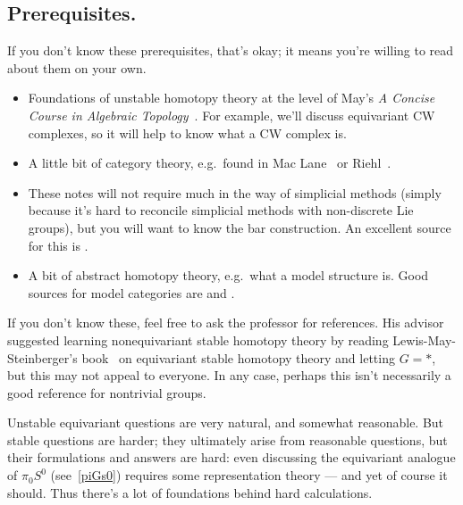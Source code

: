 \subsection*{Prerequisites.} If you don't know these prerequisites, that's okay; it means you're willing to read
about them on your own.
\begin{itemize}
	\item Foundations of unstable homotopy theory at the level of May's \textit{A Concise Course in Algebraic
	Topology}~\cite{ConciseCourse}. For example, we'll discuss equivariant CW complexes, so it will help to know
	what a CW complex is.
	\item A little bit of category theory, e.g.\ found in Mac Lane~\cite{MacLane} or Riehl~\cite{RiehlCTC}.
	\item These notes will not require much in the way of simplicial methods (simply because it's hard to reconcile
	simplicial methods with non-discrete Lie groups), but you will want to know the bar construction. An excellent source for this is \cite[Chapter 4]{RiehlCHT}.
	\item A bit of abstract homotopy theory, e.g.\ what a model structure is. Good sources for model categories are \cite[Part III]{RiehlCHT} and \cite{Hovey}.
\end{itemize}
If you don't know these, feel free to ask the professor for references. His advisor suggested learning
nonequivariant stable homotopy theory by reading Lewis-May-Steinberger's book~\cite{LMS} on equivariant stable
homotopy theory and letting $G = *$, but this may not appeal to everyone. In any case, perhaps this isn't
necessarily a good reference for nontrivial groups.

Unstable equivariant questions are very natural, and somewhat reasonable. But stable questions are harder; they
ultimately arise from reasonable questions, but their formulations and answers are hard: even discussing the
equivariant analogue of $\pi_0S^0$ (see~\eqref{piGs0}) requires some representation theory --- and yet of course it
should. Thus there's a lot of foundations behind hard calculations.
